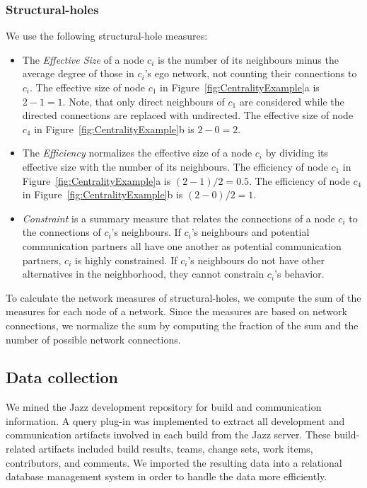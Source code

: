 
\subsubsection{Structural-holes}
We use the following structural-hole measures:
\begin{itemize}
  \item The \emph{Effective Size} of a node $c_i$ is the number of its
  neighbours minus the average degree of those in $c_i$'s ego network, not
  counting their connections to $c_i$. The effective size of node $c_1$ in 
  Figure~\ref{fig:CentralityExample}a is $2-1=1$. Note, that only direct
  neighbours of $c_1$ are considered while the directed connections are replaced
  with undirected. The effective size of node $c_4$ in 
  Figure~\ref{fig:CentralityExample}b is $2-0=2$.
  
  \item The \emph{Efficiency} normalizes the effective size of a node $c_i$ by
  dividing its effective size with the number of its neighbours. The
  efficiency of node $c_1$ in Figure~\ref{fig:CentralityExample}a is
  $(2-1)/2=0.5$. The efficiency of node $c_4$ in
  Figure~\ref{fig:CentralityExample}b is $(2-0)/2=1$.
  
  \item \emph{Constraint} is a summary measure that relates the connections of a
  node $c_i$ to the connections of $c_i$'s neighbours. If $c_i$'s neighbours and
  potential communication partners all have one another as potential communication
  partners, $c_i$ is highly constrained. If $c_i$'s neighbours do not have other
  alternatives in the neighborhood, they cannot constrain $c_i$'s behavior. 
\end{itemize}

To calculate the network measures of
structural-holes, we compute the sum of the measures for each node of a network.
Since the measures are based on network connections, we normalize the sum by
computing the fraction of the sum and the number of possible network connections.

\subsection{Data collection} 
We mined the Jazz development repository for build and communication information.
A query plug-in was implemented to extract all development and communication
artifacts involved in each build from the Jazz server. These build-related
artifacts included build results, teams, change sets, work items, contributors,
and comments. We imported the resulting data into a relational database
management system in order to handle the data more efficiently.

